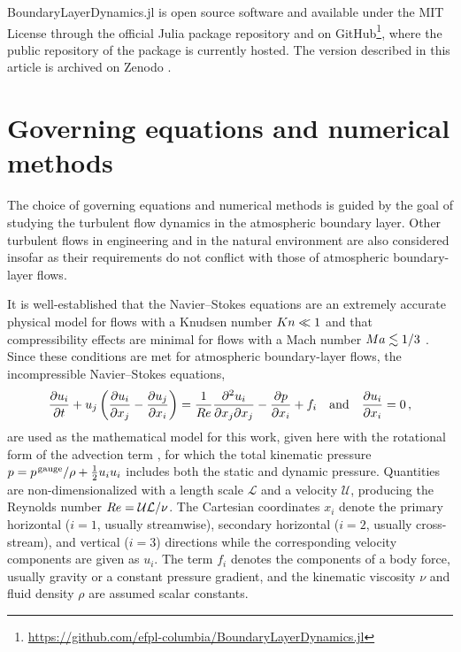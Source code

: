 \documentclass[gmd, manuscript]{copernicus}
\begin{document}
BoundaryLayerDynamics.jl is open source software and available under the MIT License through the official Julia package repository and on GitHub\footnote{\url{https://github.com/efpl-columbia/BoundaryLayerDynamics.jl}}, where the public repository of the package is currently hosted.
The version described in this article is archived on Zenodo \citep{Schmid2023a}.

\hypertarget{sec:numerics}{%
\section{Governing equations and numerical methods}\label{sec:numerics}}

The choice of governing equations and numerical methods is guided by the goal of studying the turbulent flow dynamics in the atmospheric boundary layer.
Other turbulent flows in engineering and in the natural environment are also considered insofar as their requirements do not conflict with those of atmospheric boundary-layer flows.

It is well-established that the Navier--Stokes equations are an extremely accurate physical model for flows with a Knudsen number \(K \mkern -.2mun \ll 1\) and that compressibility effects are minimal for flows with a Mach number \(M \mkern -.2mua \lesssim 1/3\) \citep{Panton2013}.
Since these conditions are met for atmospheric boundary-layer flows, the incompressible Navier--Stokes equations,
\begin{equation}
  \frac{\partial u_i}{\partial t} + u_j \left( \frac{\partial u_i}{\partial x_j} - \frac{\partial u_j}{\partial x_i} \right) =
  \frac{1}{R \mkern -.2mue} \frac{\partial^2 u_i}{\partial x_j \partial x_j}
  - \frac{\partial p}{\partial x_i}
  + f_i
  \quad \text{and} \quad
  \frac{\partial u_i}{\partial x_i} = 0
  \,,
\label{eq:ns-pd}
\end{equation}
are used as the mathematical model for this work, given here with the rotational form of the advection term \citep{Orszag1971a}, for which the total kinematic pressure \(p = p^\mathrm{\mkern2mu gauge}/\rho + \frac{1}{2} u_i u_i\) includes both the static and dynamic pressure.
Quantities are non-dimensionalized with a length scale \(\mathcal{L}\) and a velocity \(\mathcal{U}\), producing the Reynolds number \(R \mkern -.2mue= \mathcal{U} \mathcal{L}/\nu\).
The Cartesian coordinates \(x_i\) denote the primary horizontal (\(i=1\), usually streamwise), secondary horizontal (\(i=2\), usually cross-stream), and vertical (\(i=3\)) directions while the corresponding velocity components are given as \(u_i\).
The term \(f_i\) denotes the components of a body force, usually gravity or a constant pressure gradient, and the kinematic viscosity \(\nu\) and fluid density \(\rho\) are assumed scalar constants.
\end{document}
